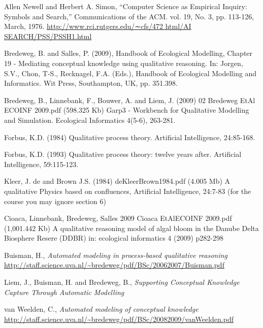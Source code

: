 \documentclass{article}
\begin{document}
\begin{thebibliography}{99}

 Allen Newell and Herbert A. Simon, “Computer Science as Empirical Inquiry: Symbols and Search,” Communications of the ACM. vol. 19, No. 3, pp. 113-126, March, 1976. \url{http://www.rci.rutgers.edu/∼cfs/472 html/AI SEARCH/PSS/PSSH1.html}

 Bredeweg, B. and Salles, P. (2009), Handbook of
Ecological Modelling, Chapter 19 - Mediating conceptual knowledge using
qualitative reasoning. In: J\/orgen, S.V., Chon, T-S., Recknagel, F.A. (Eds.),
Handbook of Ecological Modelling and Informatics. Wit Press, Southampton, UK,
pp. 351.398.

 Bredeweg, B., Linnebank, F., Bouwer, A. and Liem, J.
(2009) 02 Bredeweg EtAl ECOINF 2009.pdf (598.325 Kb) Garp3 - Workbench for
Qualitative Modelling and Simulation. Ecological Informatics 4(5-6), 263-281.

 Forbus, K.D. (1984) Qualitative process theory. Artificial 
Intelligence, 24:85-168. 

 Forbus, K.D. (1993) Qualitative process theory: twelve years
after. Artificial Intelligence, 59:115-123. 

 Kleer, J. de and Brown J.S. (1984) deKleerBrown1984.pdf (4.005
Mb) A qualitative Physics based on confluences, Artificial Intelligence,
24:7-83 (for the course you may ignore section 6)

 Cioaca, Linnebank, Bredeweg, Salles 2009 Cioaca EtAlECOINF
2009.pdf (1,001.442 Kb) A qualitative reasoning model of algal bloom in the
Danube Delta Biosphere Resere (DDBR) in: ecological informatics 4 (2009)
p282-298

 Buisman, H., \emph{Automated modeling in process-based
qualitative reasoning}
\url{http://staff.science.uva.nl/~bredeweg/pdf/BSc/20062007/Buisman.pdf}

 Liem, J., Buisman, H. and Bredeweg, B., \emph{Supporting
Conceptual Knowledge Capture Through Automatic Modelling}

 van Weelden, C., \emph{Automated modeling of conceptual
knowledge}
\url{http://staff.science.uva.nl/~bredeweg/pdf/BSc/20082009/vanWeelden.pdf}

\end{thebibliography}
\end{document}
